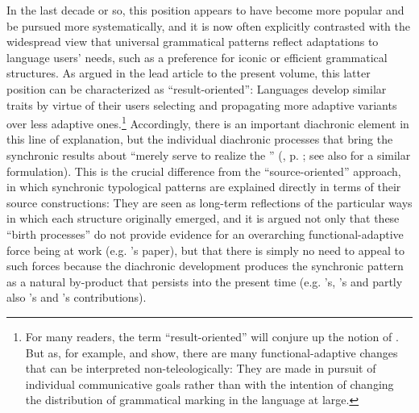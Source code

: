 \documentclass[output=paper]{langsci/langscibook}
\begin{document}
In the last decade or so, this position appears to have become more popular and be pursued more systematically, and it is now often explicitly contrasted with the widespread view that universal grammatical patterns reflect adaptations to language users’ needs, such as a preference for iconic or efficient grammatical structures. As argued in the lead article to the present volume, this latter position can be characterized as “result-oriented”: Languages develop similar traits by virtue of their users selecting and propagating more adaptive variants over less adaptive ones.\footnote{For many readers, the term “result-oriented” will conjure up the notion of . But as, for example, \citet{Keller1994} and \citet[64--71]{Croft2000_Change} show, there are many functional-adaptive changes that can be interpreted non-teleologically: They are made in pursuit of individual communicative goals rather than with the intention of changing the distribution of grammatical marking in the language at large.} Accordingly, there is an important diachronic element in this line of explanation, but the individual diachronic processes that bring the synchronic results about “merely serve to realize the ” (, p. \pageref{p:haspelmath:merelyserve}; see also \citet[266]{Hawkins2004} for a similar formulation). This is the crucial difference from the “source-oriented” approach, in which synchronic typological patterns are explained directly in terms of their source constructions: They are seen as long-term reflections of the particular ways in which each structure originally emerged, and it is argued not only that these “birth processes” do not provide evidence for an overarching functional-adaptive force being at work (e.g. ’s paper), but that there is simply no need to appeal to such forces because the diachronic development produces the synchronic pattern as a natural by-product that persists into the present time (e.g. ’s, ’s and partly also ’s and ’s contributions). 
\end{document}
